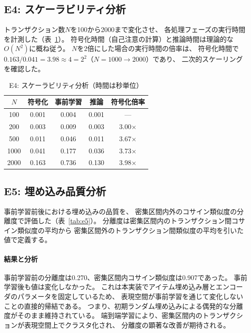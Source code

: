 \documentclass[sigconf,nonacm]{acmart}
\begin{document}
\subsection{E4: スケーラビリティ分析}

トランザクション数$N$を100から2000まで変化させ、
各処理フェーズの実行時間を計測した（表~\ref{tab:e4}）。
符号化時間（自己注意の計算）と推論時間は理論的な$O(N^2)$に概ね従う。
$N$を2倍にした場合の実行時間の倍率は、
符号化時間で$0.163/0.041 = 3.98 \approx 4 = 2^2$（$N=1000 \to 2000$）であり、
二次的スケーリングを確認した。

\begin{table}[t]
\centering
\caption{E4: スケーラビリティ分析（時間は秒単位）}
\label{tab:e4}
\begin{tabular}{ccccc}
\toprule
$N$ & 符号化 & 事前学習 & 推論 & 符号化倍率 \\
\midrule
100 & 0.001 & 0.004 & 0.001 & --- \\
200 & 0.003 & 0.009 & 0.003 & 3.00$\times$ \\
500 & 0.011 & 0.046 & 0.011 & 3.67$\times$ \\
1000 & 0.041 & 0.177 & 0.036 & 3.73$\times$ \\
2000 & 0.163 & 0.736 & 0.130 & 3.98$\times$ \\
\bottomrule
\end{tabular}
\end{table}

\subsection{E5: 埋め込み品質分析}

事前学習前後における埋め込みの品質を、
密集区間内外のコサイン類似度の分離度で評価した（表~\ref{tab:e5}）。
分離度は密集区間内のトランザクション間コサイン類似度の平均から
密集区間外のトランザクション間類似度の平均を引いた値で定義する。

\paragraph{結果と分析}
事前学習前の分離度は0.270、密集区間内コサイン類似度は0.907であった。
事前学習後も値は変化しなかった。
これは本実装でアイテム埋め込み層とエンコーダのパラメータを固定しているため、
表現空間が事前学習を通じて変化しないことの直接的帰結である。
つまり、初期ランダム埋め込みによる偶発的な分離度がそのまま維持されている。
端到端学習により、密集区間内のトランザクションが表現空間上でクラスタ化され、
分離度の顕著な改善が期待される。
\end{document}

